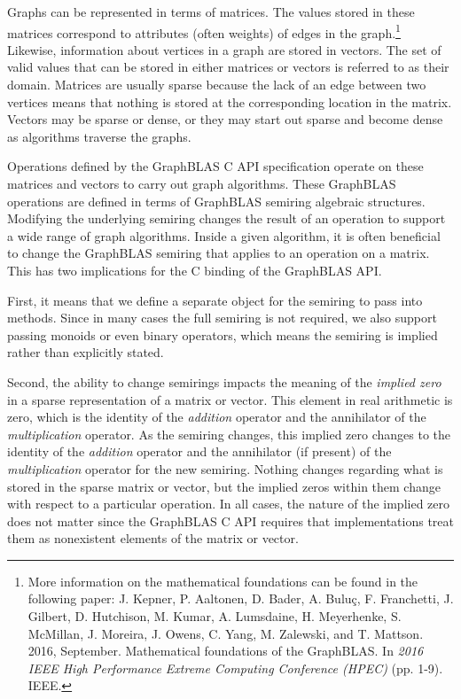 Graphs can be represented in terms of matrices. The values stored in these 
matrices correspond to attributes (often weights) of edges in the graph.\footnote{More information on the mathematical foundations can be found in the following paper: J. Kepner, P. Aaltonen, D. Bader,  A. Buluç, F. Franchetti, J. Gilbert, D. Hutchison, M. Kumar, A. Lumsdaine, H. Meyerhenke, S. McMillan, J. Moreira, J. Owens, C. Yang, M. Zalewski, and T. Mattson. 2016, September. Mathematical foundations of the GraphBLAS. In \emph{2016 IEEE High Performance Extreme Computing Conference (HPEC)} (pp. 1-9). IEEE.} 
Likewise, information about vertices in a graph are stored in vectors.
The set of valid values that can be stored in either matrices or vectors
is referred to as their domain. Matrices are usually sparse because the 
lack of an edge between two vertices means that nothing is stored at the 
corresponding location in the matrix.  Vectors may be sparse or dense, or they may 
start out sparse and become dense as algorithms traverse the graphs.

Operations defined by the GraphBLAS C API specification operate on these 
matrices and vectors to carry out graph algorithms.  These GraphBLAS 
operations are defined in terms of GraphBLAS semiring algebraic 
structures. Modifying the underlying semiring changes the result of 
an operation to support a wide range of graph algorithms.
Inside a given algorithm, it is often beneficial to change the GraphBLAS 
semiring that applies to an operation on a matrix.  This has two 
implications for the C binding of the GraphBLAS API.  

First, it means that we define a separate object for the semiring 
to pass into methods.  Since in many cases the full
semiring is not required, we also support passing monoids or
even binary operators, which means the semiring is implied rather than 
explicitly stated.

Second, the ability to change semirings impacts the meaning of 
the \emph{implied zero} in a sparse representation of a matrix or vector.
This element in real arithmetic is zero, which is the 
identity of the \emph{addition} operator and the annihilator of the
\emph{multiplication} operator.  As the semiring changes, this 
implied zero changes to the identity of the \emph{addition} operator 
and the annihilator (if present) of the \emph{multiplication} operator 
for the new semiring. Nothing changes regarding what is stored in the sparse 
matrix or vector, but the implied zeros within them change with respect to a 
particular operation. In all cases, the nature of the implied zero does not 
matter since the GraphBLAS C API requires that implementations treat them as 
nonexistent elements of the matrix or vector.

